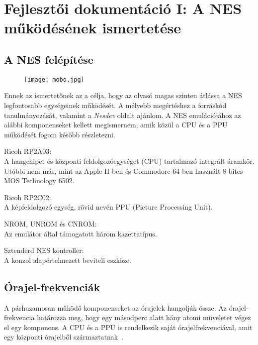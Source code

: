 \chapter{Fejlesztői dokumentáció I: A NES működésének ismertetése} %
\label{ch:impl}

\section{A NES felépítése}

\begin{figure}[H]
	\centering
	\texttt{[image: mobo.jpg]}
\end{figure}

Ennek az ismertetőnek az a célja, hogy az olvasó magas szinten átlássa a NES legfontosabb egységeinek működését. A mélyebb megértéshez a forráskód tanulmányozását, valamint a \emph{Nesdev}\cite{ref} oldalt ajánlom.
A NES emulációjához az alábbi komponenseket kellett megismernem, amik közül a CPU és a PPU működését fogom később részletezni.

\begin{compactdesc}
	\item[Ricoh RP2A03:] 
	\hfill \\
	A hangchipet és központi feldolgozóegységet (CPU) tartalmazó integrált áramkör. Utóbbi nem más, mint az Apple II-ben és Commodore 64-ben használt 8-bites MOS Technology 6502.
	\item[Ricoh RP2C02:]
	\hfill \\
	A képfeldolgozó egység, rövid nevén PPU (Picture Processing Unit).
	\item[NROM\cite{nromref}, UNROM\cite{unromref} és CNROM\cite{cnromref}:] 
	\hfill \\
	Az emulátor által támogatott három kazettatípus.
	\item[Sztenderd NES kontroller\cite{control}:]
	\hfill \\
	A konzol alapértelmezett beviteli eszköze.
\end{compactdesc}

\section{Órajel-frekvenciák}
A párhuzamosan működő komponenseket az órajelek hangolják össze. Az órajel-frekvencia határozza meg, hogy egy másodperc alatt hány atomi műveletet végez el egy komponens.
A CPU és a PPU is rendelkezik saját órajelfrekvenciával, amit egy központi órajelből származtatnak~\cite{nesclocks}.

